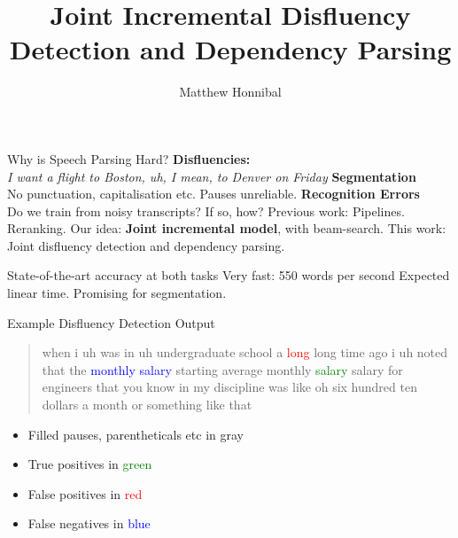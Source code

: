 \documentclass[color=usenames,dvipsnames]{lecture}
\title{Joint Incremental Disfluency Detection and Dependency Parsing}
\author{Matthew Honnibal}
\begin{document}
\titleslide

\begin{points}{Why is Speech Parsing Hard?}
\p \textbf{Disfluencies:}\\
\emph{I want a flight to Boston, uh, I mean, to Denver on Friday}
\p \textbf{Segmentation}\\
No punctuation, capitalisation etc. Pauses unreliable.
\p \textbf{Recognition Errors}\\
Do we train from noisy transcripts? If so, how?
\p Previous work: Pipelines. Reranking.
\p Our idea: \textbf{Joint incremental model}, with beam-search.
\p This work: Joint disfluency detection and dependency parsing.\\
\begin{itemize}
\p State-of-the-art accuracy at both tasks
\p Very fast: 550 words per second
\p Expected linear time. Promising for segmentation.
\end{itemize}
\end{points}

\begin{plain}{Example Disfluency Detection Output}

\begin{quote}
when i \textcolor{faint}{uh} was in \textcolor{faint}{uh} undergraduate school a
\textcolor{red}{long} long time ago
i \textcolor{faint}{uh} noted that the \textcolor{blue}{monthly salary} starting 
average monthly \textcolor{green}{salary} salary for engineers that
\textcolor{faint}{you know}
in my discipline was \textcolor{faint}{like oh} six hundred ten dollars a month or something like that
\end{quote}

\begin{itemize}
\item Filled pauses, parentheticals etc in \textcolor{faint}{gray}
\item True positives in \textcolor{green}{green}
\item False positives in \textcolor{red}{red}
\item False negatives in \textcolor{blue}{blue}
\end{itemize}

\end{plain}
\end{document}
